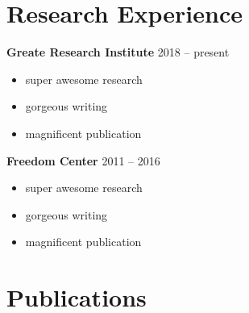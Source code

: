 \section*{\textcolor{Burnt Orange}{Research Experience}\hrulefill}
\vspace{-2.4mm}
\textbf{Greate Research Institute} \hfill 2018 -- present
\begin{itemize}[leftmargin=2ex]
	\item super awesome research
	\item gorgeous writing
	\item magnificent publication
\end{itemize}
\textbf{Freedom Center} \hfill 2011 -- 2016
\begin{itemize}[leftmargin=2ex]
	\item super awesome research
	\item gorgeous writing
	\item magnificent publication
\end{itemize}
\vspace{-3mm}


\section*{\textcolor{Burnt Orange}{Publications}\hrulefill}
\vspace{-2.4mm}
